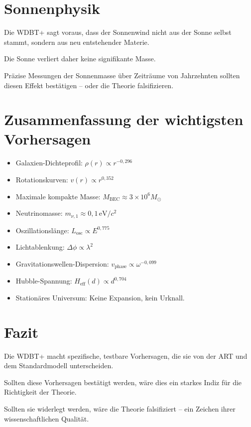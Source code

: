 \section{Sonnenphysik}

Die WDBT+ sagt voraus, dass der Sonnenwind nicht aus der Sonne selbst stammt, sondern aus neu entstehender Materie.

Die Sonne verliert daher keine signifikante Masse.

Präzise Messungen der Sonnenmasse über Zeiträume von Jahrzehnten sollten diesen Effekt bestätigen – oder die Theorie falsifizieren.

\section{Zusammenfassung der wichtigsten Vorhersagen}

\begin{itemize}
\item Galaxien-Dichteprofil: \( \rho(r) \propto r^{-0,296} \)
\item Rotationskurven: \( v(r) \propto r^{0,352} \)
\item Maximale kompakte Masse: \( M_{\text{BEC}} \approx 3 \times 10^6 M_{\odot} \)
\item Neutrinomasse: \( m_{\nu,1} \approx 0,1 \, \text{eV}/c^2 \)
\item Oszillationslänge: \( L_{\text{osc}} \propto E^{0,775} \)
\item Lichtablenkung: \( \Delta\phi \propto \lambda^2 \)
\item Gravitationswellen-Dispersion: \( v_{\text{phase}} \propto \omega^{-0,099} \)
\item Hubble-Spannung: \( H_{\text{eff}}(d) \propto d^{0,704} \)
\item Stationäres Universum: Keine Expansion, kein Urknall.
\end{itemize}

\section{Fazit}

Die WDBT+ macht spezifische, testbare Vorhersagen, die sie von der ART und dem Standardmodell unterscheiden.

Sollten diese Vorhersagen bestätigt werden, wäre dies ein starkes Indiz für die Richtigkeit der Theorie.

Sollten sie widerlegt werden, wäre die Theorie falsifiziert – ein Zeichen ihrer wissenschaftlichen Qualität.